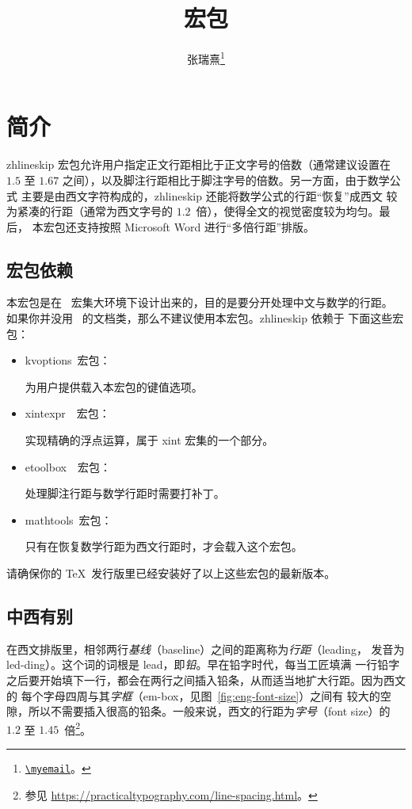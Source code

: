 \documentclass[
  zihao=5,
  no-math,a4paper]{ctexart}
\title{\vspace*{-18bp}\pkg{zhlineskip} 宏包}
\author{张瑞熹\thanks{\href{mailto:\myemail}{\nolinkurl{\myemail}}。}}
\date{2018/10/28\hskip\ccwd\relax v1.0c}
\newcommand\pkg[1]{{\normalfont\ttfamily#1}}
\newcommand*\packagedependency[1]{%
  \mbox{\pkg{#1}~宏包：}\ignorespaces
}
\begin{document}
\maketitle

\tableofcontents

\section{简介}

\pkg{zhlineskip} 宏包允许用户指定正文行距相比于正文字号的倍数（通常建议设置在
$1.5$ 至 $1.67$ 之间），以及脚注行距相比于脚注字号的倍数。另一方面，由于数学公式
主要是由西文字符构成的，\pkg{zhlineskip} 还能将数学公式的行距“恢复”成西文
较为紧凑的行距（通常为西文字号的 $1.2$~倍），使得全文的视觉密度较为均匀。最后，
本宏包还支持按照 Microsoft Word 进行“多倍行距”排版。

\subsection{宏包依赖}

本宏包是在 \CTeX\ 宏集大环境下设计出来的，目的是要分开处理中文与数学的行距。
如果你并没用 \CTeX\ 的文档类，那么不建议使用本宏包。\pkg{zhlineskip} 依赖于
下面这些宏包：
\begin{itemize}
\item \packagedependency{kvoptions}
为用户提供载入本宏包的键值选项。
\item \packagedependency{xintexpr~}
实现精确的浮点运算，属于 \pkg{xint} 宏集的一个部分。
\item \packagedependency{etoolbox~}
处理脚注行距与数学行距时需要打补丁。
\item \packagedependency{mathtools}
只有在恢复数学行距为西文行距时，才会载入这个宏包。
\end{itemize}
请确保你的 \TeX\ 发行版里已经安装好了以上这些宏包的最新版本。

\subsection{中西有别}

在西文排版里，相邻两行\emph{基线}（baseline）之间的距离称为\emph{行距}（leading，
发音为 led-ding）。这个词的词根是 lead，即\emph{铅}。早在铅字时代，每当工匠填满
一行铅字之后要开始填下一行，都会在两行之间插入铅条，从而适当地扩大行距。因为西文的
每个字母四周与其\emph{字框}（em-box，见图~\ref{fig:eng-font-size}）之间有
较大的空隙，所以不需要插入很高的铅条。一般来说，西文的行距为\emph{字号}（font
size）的 $1.2$ 至 $1.45$~倍\footnote{参见
\url{https://practicaltypography.com/line-spacing.html}。}。
\end{document}
